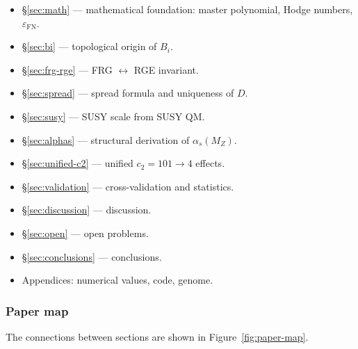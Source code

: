 \documentclass[11pt,a4paper]{article}
\newcommand{\epsFN}{\ensuremath{\varepsilon_{\text{FN}}}}
\theoremstyle{definition}
\begin{document}
\begin{itemize}
    \item \S\ref{sec:math} --- mathematical foundation:
          master polynomial, Hodge numbers, $\epsFN$.
    \item \S\ref{sec:bi} --- topological origin of $B_i$.
    \item \S\ref{sec:frg-rge} --- FRG $\leftrightarrow$ RGE invariant.
    \item \S\ref{sec:spread} --- spread formula and uniqueness of $D$.
    \item \S\ref{sec:susy} --- SUSY scale from SUSY QM.
    \item \S\ref{sec:alphas} --- structural derivation of $\alpha_s(M_Z)$.
    \item \S\ref{sec:unified-c2} --- unified $c_2 = 101
          \to 4$ effects.
    \item \S\ref{sec:validation} --- cross-validation and statistics.
    \item \S\ref{sec:discussion} --- discussion.
    \item \S\ref{sec:open} --- open problems.
    \item \S\ref{sec:conclusions} --- conclusions.
    \item Appendices: numerical values, code, genome.
\end{itemize}

\subsubsection{Paper map}
\label{subsubsec:paper-map}

The connections between sections are shown in Figure~\ref{fig:paper-map}.
\end{document}
